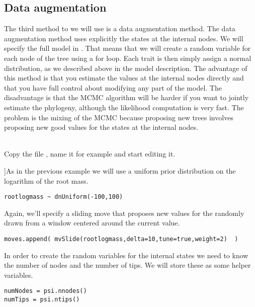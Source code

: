 \subsection{Data augmentation}

The third method to we will use is a data augmentation method. The data augmentation method uses explicitly the states at the internal nodes. We will specify the full model in \Rev.
That means that we will create a random variable for each node of the tree using a for loop. Each trait is then simply assign a normal distribution, as we described above in the model description.
The advantage of this method is that you estimate the values at the internal nodes directly and that you have full control about modifying any part of the model. The disadvantage is that the MCMC algorithm will be harder if you want to jointly estimate the phylogeny, although the likelihood computation is very fast. The problem is the mixing of the MCMC because proposing new trees involves proposing new good values for the states at the internal nodes.

\noindent \\ \impmark Copy the file , name it for example  and start editing it.

]As in the previous example we will use a uniform prior distribution on the logarithm of the root mass.
{\tt \small \begin{snugshade*}
\begin{lstlisting}
rootlogmass ~ dnUniform(-100,100)
\end{lstlisting}
\end{snugshade*}}
Again, we'll specify a sliding move that proposes new values for the  randomly drawn from a window centered around the current value.
{\tt \small \begin{snugshade*}
\begin{lstlisting}
moves.append( mvSlide(rootlogmass,delta=10,tune=true,weight=2)  )
\end{lstlisting}
\end{snugshade*}}

In order to create the random variables for the internal states we need to know the number of nodes and the number of tips.
We will store these as some helper variables.
{\tt \small \begin{snugshade*}
\begin{lstlisting}
numNodes = psi.nnodes()
numTips = psi.ntips()
\end{lstlisting}
\end{snugshade*}}

